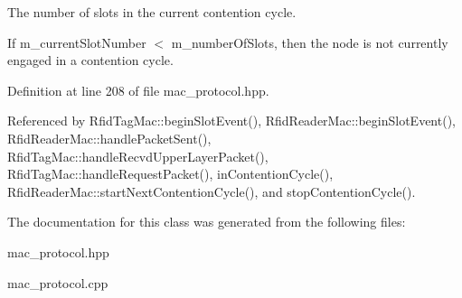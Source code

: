 The number of slots in the current contention cycle. 

If m\_\-current\-Slot\-Number $<$ m\_\-number\-Of\-Slots, then the node is not currently engaged in a contention cycle. 

Definition at line 208 of file mac\_\-protocol.hpp.

Referenced by Rfid\-Tag\-Mac::begin\-Slot\-Event(), Rfid\-Reader\-Mac::begin\-Slot\-Event(), Rfid\-Reader\-Mac::handle\-Packet\-Sent(), Rfid\-Tag\-Mac::handle\-Recvd\-Upper\-Layer\-Packet(), Rfid\-Tag\-Mac::handle\-Request\-Packet(), in\-Contention\-Cycle(), Rfid\-Reader\-Mac::start\-Next\-Contention\-Cycle(), and stop\-Contention\-Cycle().

The documentation for this class was generated from the following files:\begin{CompactItemize}
\item 
mac\_\-protocol.hpp\item 
mac\_\-protocol.cpp\end{CompactItemize}
